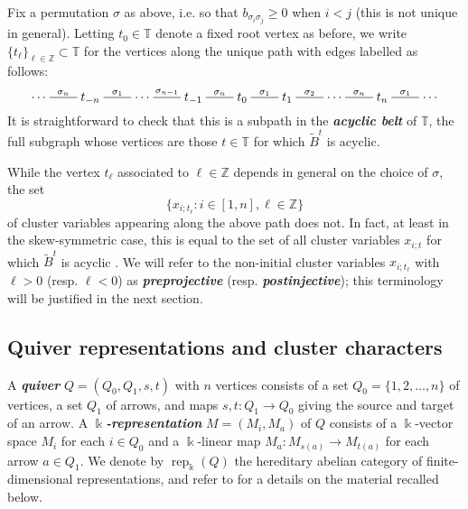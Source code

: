 \documentclass[12pt]{amsart}
\newcommand{\saySS}[1]{\say[SS]{\color{blue}{\bf SS:}\;#1}}
\newcommand{\sayDR}[1]{\say[DR]{\color{red}{\bf DR:}\;#1}}
\newcommand{\newword}[1]{\textbf{\emph{#1}}}
\newcommand{\TT}{\mathbb{T}}
\newcommand{\ZZ}{\mathbb{Z}}
\newcommand{\kk}{\Bbbk}
\newcommand{\rep}{\operatorname{rep}}
\newcommand{\dashname}[1]{\stackrel{#1}{\begin{picture}(22,3)\put(0,2.5){\line(1,0){22}}\end{picture}}}
\newcommand{\Zidx}{\ell}
\theoremstyle{remark}
\numberwithin{equation}{section}
\numberwithin{figure}{section}
\begin{document}
Fix a permutation $\sigma$ as above, i.e. so that $b_{\sigma_i \sigma_j} \geq 0$ when $i < j$ (this is not unique in general). Letting $t_0 \in \TT$ denote a fixed root vertex as before, we write $\{t_\Zidx\}_{\Zidx \in \ZZ} \subset \TT$ for the vertices along the unique path with edges labelled as follows:
\begin{equation}
  \cdots
  \dashname{\sigma_n}
  t_{-n}
  \dashname{\sigma_1}
  \cdots
  \dashname{\sigma_{n-1}}
  t_{-1}
  \dashname{\sigma_n}
  t_0
  \dashname{\sigma_1}
  t_1
  \dashname{\sigma_2}
  \cdots
  \dashname{\sigma_n}
  t_n
  \dashname{\sigma_1}
  \cdots
  \label{eq:path}
\end{equation}
It is straightforward to check that this is a subpath in the \newword{acyclic belt} of $\TT$, the full subgraph whose vertices are those $t \in \TT$ for which $\widetilde{B}^t$ is acyclic.

While the vertex $t_\ell$ associated to $\Zidx \in \ZZ$ depends in general on the choice of $\sigma$, the set $$\{x_{i;t_\Zidx}: i \in [1,n], \Zidx \in \ZZ\}$$ of cluster variables appearing along the above path does not. In fact, at least in the skew-symmetric case, this is equal to the set of all cluster variables $x_{i;t}$ for which $\widetilde{B}^t$ is acyclic \cite[Cor. 4]{CK06}. 
We will refer to the non-initial cluster variables $x_{i;t_\Zidx}$ with $\Zidx>0$ (resp. $\Zidx<0$) as \newword{preprojective} (resp. \newword{postinjective}); this terminology will be justified in the next section.

\subsection{Quiver representations and cluster characters}\label{sec:quiverbackground}
A \newword{quiver} $Q=(Q_0,Q_1,s,t)$ with $n$ vertices consists of a set $Q_0=\{1,2,\ldots,n\}$ of vertices, a set $Q_1$ of arrows, and maps $s,t:Q_1\to Q_0$ giving the source and target of an arrow.
A \newword{$\kk$-representation} $M=(M_i,M_a)$ of $Q$ consists of a $\kk$-vector space $M_i$ for each $i\in Q_0$ and a $\kk$-linear map $M_a:M_{s(a)}\to M_{t(a)}$ for each arrow $a\in Q_1$. We denote by $\rep_\kk(Q)$ the hereditary abelian category of finite-dimensional representations, and refer to \cite{ASS06} for a details on the material recalled below. 
\end{document}
